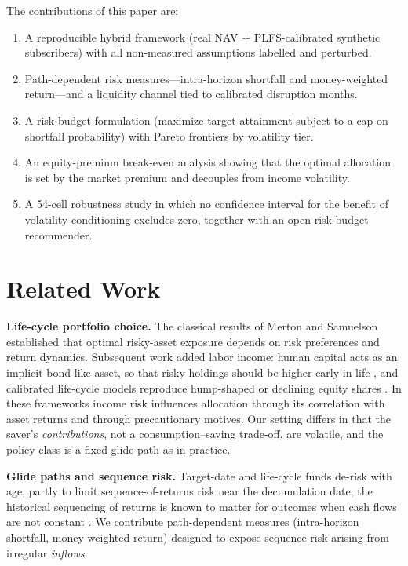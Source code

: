 \documentclass[conference]{IEEEtran}
\begin{document}
The contributions of this paper are:
\begin{enumerate}
\item A reproducible hybrid framework (real NAV + PLFS-calibrated synthetic subscribers) with all non-measured assumptions labelled and perturbed.
\item Path-dependent risk measures---intra-horizon shortfall and money-weighted return---and a liquidity channel tied to calibrated disruption months.
\item A risk-budget formulation (maximize target attainment subject to a cap on shortfall probability) with Pareto frontiers by volatility tier.
\item An equity-premium break-even analysis showing that the optimal allocation is set by the market premium and decouples from income volatility.
\item A 54-cell robustness study in which no confidence interval for the benefit of volatility conditioning excludes zero, together with an open risk-budget recommender.
\end{enumerate}

\section{Related Work}
\textbf{Life-cycle portfolio choice.} The classical results of Merton and Samuelson \cite{merton,samuelson} established that optimal risky-asset exposure depends on risk preferences and return dynamics. Subsequent work added labor income: human capital acts as an implicit bond-like asset, so that risky holdings should be higher early in life \cite{bms,viceira}, and calibrated life-cycle models reproduce hump-shaped or declining equity shares \cite{cgm,gm,cv}. In these frameworks income risk influences allocation through its correlation with asset returns and through precautionary motives. Our setting differs in that the saver's \emph{contributions}, not a consumption--saving trade-off, are volatile, and the policy class is a fixed glide path as in practice.

\textbf{Glide paths and sequence risk.} Target-date and life-cycle funds de-risk with age, partly to limit sequence-of-returns risk near the decumulation date; the historical sequencing of returns is known to matter for outcomes when cash flows are not constant \cite{bengen}. We contribute path-dependent measures (intra-horizon shortfall, money-weighted return) designed to expose sequence risk arising from irregular \emph{inflows}.
\end{document}
